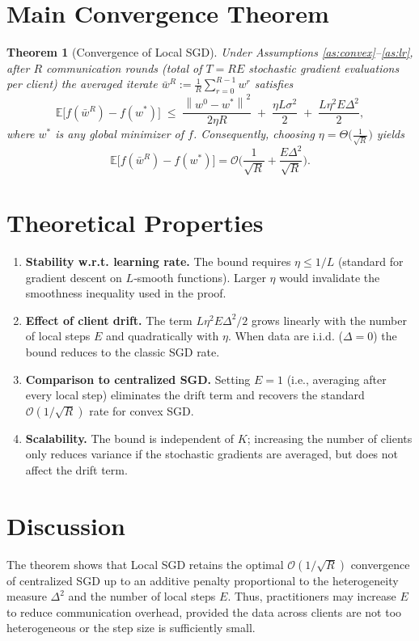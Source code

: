 \documentclass{article}
\newtheorem{theorem}{Theorem}
\newcommand{\E}{\mathbb{E}}
\newcommand{\norm}[1]{\left\lVert#1\right\rVert}
\begin{document}
\section*{Main Convergence Theorem}
\begin{theorem}[Convergence of Local SGD]\label{thm:main}
Under Assumptions \ref{as:convex}–\ref{as:lr}, after $R$ communication
rounds (total of $T=RE$ stochastic gradient evaluations per client) the
averaged iterate $\bar w^{R}:=\frac1R\sum_{r=0}^{R-1} w^{r}$ satisfies
\[
\E\!\big[f(\bar w^{R})-f(w^{*})\big]\;\le\;
\frac{\norm{w^{0}-w^{*}}^{2}}{2\eta R}
\;+\;
\frac{\eta L\sigma^{2}}{2}
\;+\;
\frac{L\eta^{2}E\Delta^{2}}{2},
\]
where $w^{*}$ is any global minimizer of $f$.
Consequently, choosing $\eta=\Theta\!\big(\frac{1}{\sqrt{R}}\big)$ yields
\[
\E\!\big[f(\bar w^{R})-f(w^{*})\big]=
\mathcal O\!\Big(\frac{1}{\sqrt{R}}+\frac{E\Delta^{2}}{\sqrt{R}}\Big).
\]
\end{theorem}

\section*{Theoretical Properties}
\begin{enumerate}[label=\arabic*.]
\item \textbf{Stability w.r.t. learning rate.}  The bound requires
$\eta\le1/L$ (standard for gradient descent on $L$‑smooth functions).  Larger
$\eta$ would invalidate the smoothness inequality used in the proof.
\item \textbf{Effect of client drift.}  The term $L\eta^{2}E\Delta^{2}/2$
grows linearly with the number of local steps $E$ and quadratically with
$\eta$.  When data are i.i.d. ($\Delta=0$) the bound reduces to the classic
SGD rate.
\item \textbf{Comparison to centralized SGD.}  Setting $E=1$ (i.e.,
averaging after every local step) eliminates the drift term and recovers
the standard $\mathcal O(1/\sqrt{R})$ rate for convex SGD.
\item \textbf{Scalability.}  The bound is independent of $K$; increasing the
number of clients only reduces variance if the stochastic gradients are
averaged, but does not affect the drift term.
\end{enumerate}

\section*{Discussion}
The theorem shows that Local SGD retains the optimal $\mathcal O(1/\sqrt{R})$
convergence of centralized SGD up to an additive penalty proportional to the
heterogeneity measure $\Delta^{2}$ and the number of local steps $E$.
Thus, practitioners may increase $E$ to reduce communication overhead,
provided the data across clients are not too heterogeneous or the step size
is sufficiently small.
\end{document}
